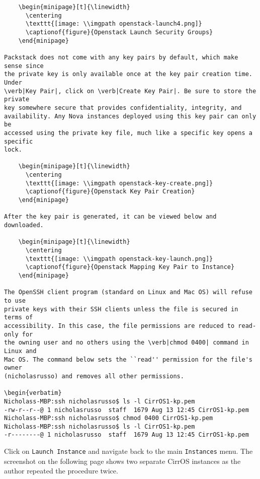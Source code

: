 \begin{verbatim}
    \begin{minipage}[t]{\linewidth}
	  \centering
      \texttt{[image: \\imgpath openstack-launch4.png]}
      \captionof{figure}{Openstack Launch Security Groups}
    \end{minipage}

Packstack does not come with any key pairs by default, which make sense since
the private key is only available once at the key pair creation time. Under
\verb|Key Pair|, click on \verb|Create Key Pair|. Be sure to store the private
key somewhere secure that provides confidentiality, integrity, and
availability. Any Nova instances deployed using this key pair can only be
accessed using the private key file, much like a specific key opens a specific
lock.

    \begin{minipage}[t]{\linewidth}
	  \centering
      \texttt{[image: \\imgpath openstack-key-create.png]}
      \captionof{figure}{Openstack Key Pair Creation}
    \end{minipage}

After the key pair is generated, it can be viewed below and downloaded.

    \begin{minipage}[t]{\linewidth}
	  \centering
      \texttt{[image: \\imgpath openstack-key-launch.png]}
      \captionof{figure}{Openstack Mapping Key Pair to Instance}
    \end{minipage}

The OpenSSH client program (standard on Linux and Mac OS) will refuse to use
private keys with their SSH clients unless the file is secured in terms of
accessibility. In this case, the file permissions are reduced to read-only for
the owning user and no others using the \verb|chmod 0400| command in Linux and
Mac OS. The command below sets the ``read'' permission for the file's owner
(nicholasrusso) and removes all other permissions.

\begin{verbatim}
Nicholass-MBP:ssh nicholasrusso$ ls -l CirrOS1-kp.pem
-rw-r--r--@ 1 nicholasrusso  staff  1679 Aug 13 12:45 CirrOS1-kp.pem
Nicholass-MBP:ssh nicholasrusso$ chmod 0400 CirrOS1-kp.pem
Nicholass-MBP:ssh nicholasrusso$ ls -l CirrOS1-kp.pem
-r--------@ 1 nicholasrusso  staff  1679 Aug 13 12:45 CirrOS1-kp.pem
\end{verbatim}

Click on \verb|Launch Instance| and navigate back to the main \verb|Instances|
menu. The screenshot on the following page shows two separate CirrOS instances
as the author repeated the procedure twice.

